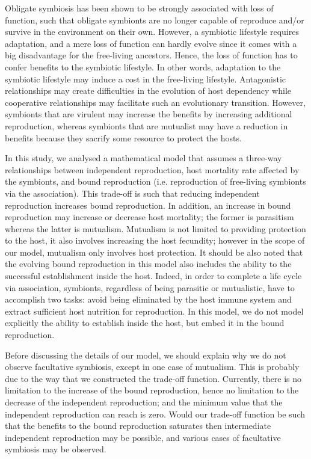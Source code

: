 \documentclass[11.5pt]{article}
\begin{document}
Obligate symbiosis has been shown to be strongly associated with loss of function, such that obligate symbionts are no longer capable of reproduce and/or survive in the environment on their own. However, a symbiotic lifestyle requires adaptation, and a mere loss of function can hardly evolve since it comes with a big disadvantage for the free-living ancestors. Hence, the loss of function has to confer benefits to the symbiotic lifestyle. In other words, adaptation to the symbiotic lifestyle may induce a cost in the free-living lifestyle. Antagonistic relationships may create difficulties in the evolution of host dependency while cooperative relationships may facilitate such an evolutionary transition. However, symbionts that are virulent may increase the benefits by increasing additional reproduction, whereas symbionts that are mutualist may have a reduction in benefits because they sacrify some resource to protect the hosts. 

\medskip

In this study, we analysed a mathematical model that assumes a three-way relationships between independent reproduction, host mortality rate affected by the symbionts, and bound reproduction (i.e. reproduction of free-living symbionts via the association). This trade-off is such that reducing independent reproduction increases bound reproduction. In addition, an increase in bound reproduction may increase or decrease host mortality; the former is parasitism whereas the latter is mutualism. Mutualism is not limited to providing protection to the host, it also involves increasing the host fecundity; however in the scope of our model, mutualism only involves host protection. It should be also noted that the evolving bound reproduction in this model also includes the ability to the successful establishment inside the host. Indeed, in order to complete a life cycle via association, symbionts, regardless of being parasitic or mutualistic, have to accomplish two tasks: avoid being eliminated by the host immune system and extract sufficient host nutrition for reproduction. In this model, we do not model explicitly the ability to establish inside the host, but embed it in the bound reproduction.

\medskip

Before discussing the details of our model, we should explain why we do not observe facultative symbiosis, except in one case of mutualism. This is probably due to the way that we constructed the trade-off function. Currently, there is no limitation to the increase of the bound reproduction, hence no limitation to the decrease of the independent reproduction; and the minimum value that the independent reproduction can reach is zero. Would our trade-off function be such that the benefits to the bound reproduction saturates then intermediate independent reproduction may be possible, and various cases of facultative symbiosis may be observed. 
\end{document}
